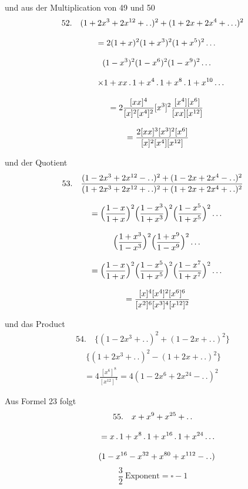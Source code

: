und aus der Multiplication von 49 und 50
\[
\begin{gathered}
52.\quad{}
(1+2x^3+2x^{12}+ .\,. )^2+(1+2x+2x^4+\mathinner{.\,.\,.})^2\\[8pt]
\quad=2(1+x)^2(1+x^3)^2(1+x^5)^2\mathinner{.\,.\,.}\\[8pt]\quad{}(1-x^3)^2(1-x^6)^2(1-x^9)^2\mathinner{.\,.\,.}\\[8pt]
\qquad\times1+xx\,.\,1+x^4\,.\,1+x^8\,.\,1+x^{10}\mathinner{.\,.\,.}\\[8pt]
\quad=2\frac{[xx]^4}{[x]^2[x^4]^2}[x^3]^2\frac{[x^4][x^6]}{[xx][x^{12}]}
\\[8pt]\quad{}=\frac{2[xx]^3[x^3]^2[x^6]}{[x]^2[x^4][x^{12}]}
\end{gathered}
\]

und der Quotient
\[
\begin{gathered}
53.\quad{}
\frac{(1-2x^3+2x^{12}- .\,. )^2+(1-2x+2x^4- .\,. )^2}
{(1+2x^3+2x^{12}+ .\,. )^2+(1+2x+2x^4+ .\,. )^2}\\[8pt]
\quad=\Bigl(\frac{1-x}{1+x}\Bigr)^2\Bigl(\frac{1-x^3}{1+x^3}\Bigr)^2\Bigl(\frac{1-x^5}{1+x^5}\Bigr)^2\mathinner{.\,.\,.}
\\[8pt]\quad{}\Bigl(\frac{1+x^3}{1-x^3}\Bigr)^2\Bigl(\frac{1+x^9}{1-x^9}\Bigr)^2\mathinner{.\,.\,.}\\[8pt]
\quad=\Bigl(\frac{1-x}{1+x}\Bigr)^2\Bigl(\frac{1-x^5}{1+x^5}\Bigr)^2\Bigl(\frac{1-x^7}{1+x^7}\Bigr)^2\mathinner{.\,.\,.}
\\[8pt]\quad{}=\frac{[x]^4[x^4]^2[x^6]^6}{[x^2]^6[x^3]^4[x^{12}]^2}
\end{gathered}
\]


und das Product
\[
\begin{gathered}
54.\quad{}
\{(1-2x^3+ .\,. )^2+(1-2x+ .\,. )^2\}\\[8pt]\quad{}\ \{(1+2x^3+ .\,. )^2-(1+2x+ .\,. )^2\}\\[8pt]
\quad=4\frac{[x^6]^8}{[x^{12}]^4}=4(1-2x^6+2x^{24}- .\,. )^2
\end{gathered}
\]

Aus Formel 23 folgt
\[
\begin{gathered}55.\quad{}
x+x^9+x^{25}+ .\,. \\[8pt]\quad{}=x\,.\,1+x^8\,.\,1+x^{16}\,.\,1+x^{24}\mathinner{.\,.\,.}\\[8pt]\quad{}(1-x^{16}-x^{32}+x^{80}+x^{112}- .\,. )\end{gathered}
\]
\[
\frac32\ \text{Exponent}=\square-1
\]

